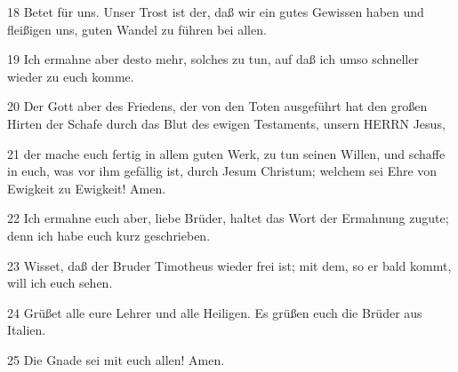 \par 18 Betet für uns. Unser Trost ist der, daß wir ein gutes Gewissen haben und fleißigen uns, guten Wandel zu führen bei allen.
\par 19 Ich ermahne aber desto mehr, solches zu tun, auf daß ich umso schneller wieder zu euch komme.
\par 20 Der Gott aber des Friedens, der von den Toten ausgeführt hat den großen Hirten der Schafe durch das Blut des ewigen Testaments, unsern HERRN Jesus,
\par 21 der mache euch fertig in allem guten Werk, zu tun seinen Willen, und schaffe in euch, was vor ihm gefällig ist, durch Jesum Christum; welchem sei Ehre von Ewigkeit zu Ewigkeit! Amen.
\par 22 Ich ermahne euch aber, liebe Brüder, haltet das Wort der Ermahnung zugute; denn ich habe euch kurz geschrieben.
\par 23 Wisset, daß der Bruder Timotheus wieder frei ist; mit dem, so er bald kommt, will ich euch sehen.
\par 24 Grüßet alle eure Lehrer und alle Heiligen. Es grüßen euch die Brüder aus Italien.
\par 25 Die Gnade sei mit euch allen! Amen.


